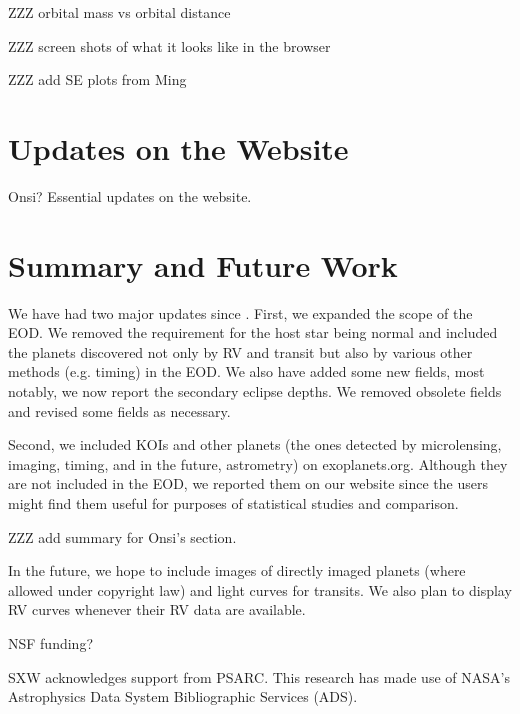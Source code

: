 \documentclass[11pt,preprint]{aastex}
\begin{document}
\begin{CJK*}{UTF8}{gbsn}
ZZZ orbital mass vs orbital distance

ZZZ screen shots of what it looks like in the browser 

ZZZ add SE plots from Ming

\section{Updates on the Website}\label{sec:website}

Onsi? Essential updates on the website.


\section{Summary and Future Work}\label{sec:summary}

We have had two major updates since \cite{Wright2011}. First, we
expanded the scope of the EOD. We removed the requirement for the host
star being normal and included the planets discovered not only by RV
and transit but also by various other methods (e.g. timing) in the
EOD. We also have added some new fields, most notably, we now report
the secondary eclipse depths. We removed obsolete fields and revised
some fields as necessary.

Second, we included KOIs and other planets (the ones detected by
microlensing, imaging, timing, and in the future, astrometry) on
exoplanets.org. Although they are not included in the EOD, we reported
them on our website since the users might find them useful for
purposes of statistical studies and comparison.

ZZZ add summary for Onsi's section.


In the future, we hope to include images of directly imaged planets
(where allowed under copyright law) and light curves for transits. We
also plan to display RV curves whenever their RV data are available.


\acknowledgments

NSF funding?

SXW acknowledges support from PSARC. This research has made use of
NASA's Astrophysics Data System Bibliographic Services (ADS). 






\end{CJK*}
\end{document}
